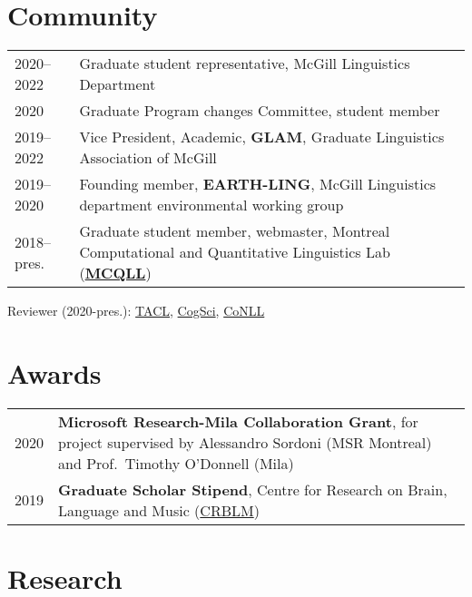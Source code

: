\documentclass[11pt,a4paper]{article}
\begin{document}
  \section{Community}
  \begin{longtable}{p{1.7cm}|p{15cm}}
    \textsc{2020--2022}
    &%
    Graduate student representative, McGill Linguistics Department\\
    2020
    &%
    Graduate Program changes Committee, student member\\
    \textsc{2019--2022}
    &%
    Vice President, Academic, \textbf{GLAM}, Graduate Linguistics Association of
    McGill\\
    \textsc{2019--2020}&%
    Founding member, \textbf{EARTH-LING}, McGill Linguistics department
    environmental working group\\
    \textsc{2018--}pres.
    &%
    Graduate student member, webmaster, Montreal Computational and Quantitative
    Linguistics Lab (\href{http://mcqll.org}{\textbf{MCQLL}})\\
  \end{longtable}
  Reviewer (2020-pres.): 
    \href{https://transacl.org/}{TACL}, %
    \href{https://cognitivesciencesociety.org/}{CogSci}, %
    \href{https://www.conll.org/}{CoNLL} %

  \section{Awards}
  \begin{longtable}{p{1.7cm}|p{15cm}}
    \textsc{2020}&%
      \textbf{Microsoft Research-Mila Collaboration Grant}, for project
      supervised by Alessandro Sordoni (MSR Montreal) and Prof.\ Timothy
      O'Donnell (Mila)\\
    \textsc{2019}&%
      \textbf{Graduate Scholar Stipend}, Centre for Research on Brain, Language
      and Music (\href{https://crblm.ca/}{CRBLM})\\
  \end{longtable}

  \section{Research}
\end{document}
